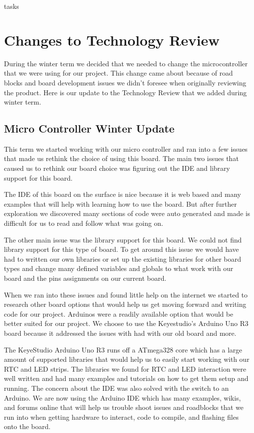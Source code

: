 tasks\documentclass[onecolumn, draftclsnofoot,10pt, compsoc]{IEEEtran}
\begin{document}
\section{Changes to Technology Review}
During the winter term we decided that we needed to change the microcontroller that we were using for our project.
This change came about because of road blocks and board development issues we didn't foresee when originally reviewing the product.
Here is our update to the Technology Review that we added during winter term.
\subsection{Micro Controller Winter Update}
This term we started working with our micro controller and ran into a few issues that made us rethink the choice of using this board.
The main two issues that caused us to rethink our board choice was figuring out the IDE and library support for this board.

The IDE of this board on the surface is nice because it is web based and many examples that will help with learning how to use the board.
But after further exploration we discovered many sections of code were auto generated and made is difficult for us to read and follow what was going on.

The other main issue was the library support for this board. We could not find library support for this type of board.
To get around this issue we would have had to written our own libraries or set up the existing libraries for other board types and change many defined variables and globals to what work with our board and the pins assignments on our current board.

When we ran into these issues and found little help on the internet we started to research other board options that would help us get moving forward and writing code for our project.
Arduinos were a readily available option that would be better suited for our project. We choose to use the Keyestudio's Arduino Uno R3 board because it addressed the issues with had with our old board and more.

The KeyeStudio Arduino Uno R3 runs off a ATmega328 core which has a large amount of supported libraries that would help us to easily start working with our RTC and LED strips.
The libraries we found for RTC and LED interaction were well written and had many examples and tutorials on how to get them setup and running.
The concern about the IDE was also solved with the switch to an Arduino.
We are now using the Arduino IDE which has many examples, wikis, and forums online that will help us trouble shoot issues and roadblocks that we run into when getting hardware to interact, code to compile, and flashing files onto the board.
\end{document}
